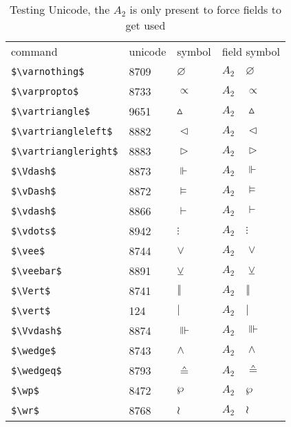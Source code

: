 \documentclass{article}
\begin{document}
\begin{table}
\begin{center}
\begin{tabular}{llll}
 command                    &unicode & symbol                & field symbol\\
 \verb#$\varnothing$#         & 8709 & $\varnothing$         & $A_2\quad \varnothing$\\
 \verb#$\varpropto$#          & 8733 & $\varpropto$          & $A_2\quad \varpropto$\\
 \verb#$\vartriangle$#        & 9651 & $\vartriangle$        & $A_2\quad \vartriangle$\\
 \verb#$\vartriangleleft$#    & 8882 & $\vartriangleleft$    & $A_2\quad \vartriangleleft$\\
 \verb#$\vartriangleright$#   & 8883 & $\vartriangleright$   & $A_2\quad \vartriangleright$\\
 \verb#$\Vdash$#              & 8873 & $\Vdash$              & $A_2\quad \Vdash$\\
 \verb#$\vDash$#              & 8872 & $\vDash$              & $A_2\quad \vDash$\\
 \verb#$\vdash$#              & 8866 & $\vdash$              & $A_2\quad \vdash$\\
 \verb#$\vdots$#              & 8942 & $\vdots$              & $A_2\quad \vdots$\\
 \verb#$\vee$#                & 8744 & $\vee$                & $A_2\quad \vee$\\
 \verb#$\veebar$#             & 8891 & $\veebar$             & $A_2\quad \veebar$\\
 \verb#$\Vert$#               & 8741 & $\Vert$               & $A_2\quad \Vert$\\
 \verb#$\vert$#                & 124 & $\vert$               & $A_2\quad \vert$\\
 \verb#$\Vvdash$#             & 8874 & $\Vvdash$             & $A_2\quad \Vvdash$\\
 \verb#$\wedge$#              & 8743 & $\wedge$              & $A_2\quad \wedge$\\
 \verb#$\wedgeq$#             & 8793 & $\wedgeq$             & $A_2\quad \wedgeq$\\
 \verb#$\wp$#                 & 8472 & $\wp$                 & $A_2\quad \wp$\\
 \verb#$\wr$#                 & 8768 & $\wr$                 & $A_2\quad \wr$\\
\end{tabular}
\end{center}
\caption{Testing Unicode, the $A_2$ is only present to force fields to get used}
\end{table}
\end{document}
